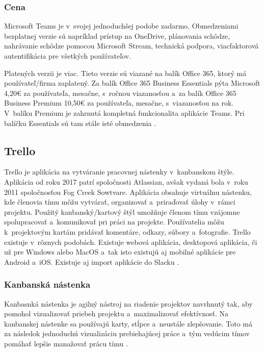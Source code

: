 \subsubsection{Cena}
\indent Microsoft Teams je v svojej jednoduchšej podobe zadarmo. Obmedzeniami bezplatnej verzie sú napríklad prístup na OneDrive, plánovania schôdze, nahrávanie schôdze pomocou Microsoft Stream, technická podpora, viacfaktorová autentifikácia pre všetkých používateľov. 

\indent Platených verzii je viac. Tieto verzie sú viazané na balík Office 365, ktorý má používateľ/firma zaplatený. Za balík Office 365 Business Essentials pýta Microsoft 4,20€ za používateľa, mesačne, s ročnou viazanosťou a za balík Office 365 Business Premium 10,50€ za používateľa, mesačne, s viazanosťou na rok. V balíku Premium je zahrnutá kompletná funkcionalita aplikácie Teams. Pri balíčku Essentials sú tam stále isté obmedzenia \cite{ms_teams}.

\subsection{Trello}
\indent Trello je aplikácia na vytváranie pracovnej nástenky v kanbanskom štýle. Aplikácia od roku 2017 patrí spoločnosti Atlassian, avšak vydaná bola v roku 2011 spoločnosťou Fog Creek Sowtvare. Aplikácia obsahuje virtuálnu nástenku, kde členovia tímu môžu vytvárať, organizovať a priraďovať úlohy v rámci projektu. Použitý kanbanský/kartový štýl umožňuje členom tímu vzájomne spolupracovať a komunikovať pri práci na projekte. Používatelia môžu k projektovým kartám pridávať komentáre, odkazy, súbory a fotografie. Trello existuje v rôznych podobách. Existuje webová aplikácia, desktopová aplikácia, či už pre Windows alebo MacOS a tak isto existujú aj mobilné aplikácie pre Android a iOS. Existuje aj import aplikácie do Slacku \cite{trello}.
\subsubsection{Kanbanská nástenka}
\indent Kanbasnká nástenka je agilný nástroj na riadenie projektov navrhnutý tak, aby pomohol vizualizovať priebeh projektu a maximalizovať efektívnosť. Na kanbanskej nástenke sa používajú karty, stĺpce a neustále zlepšovanie. Toto má za následok jednoduchú vizualizáciu prebiehajúcej práce a tým vedúcim tímov pomáhať lepšie manažovať prácu tímu \cite{kaban_board}. 

